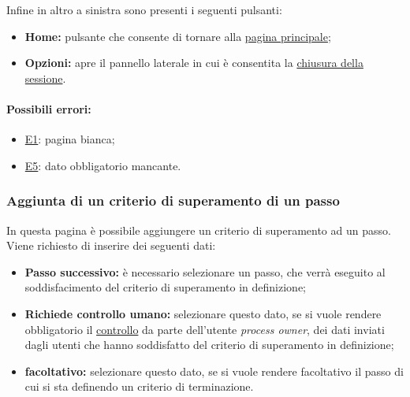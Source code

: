 Infine in altro a sinistra sono presenti i seguenti pulsanti:
\begin{itemize}
\item \textbf{Home:} pulsante che consente di tornare alla \hyperref[home]{pagina principale};
\item \textbf{Opzioni:} apre il pannello laterale in cui è consentita la \hyperref[logout]{chiusura della sessione}.
\end{itemize}

\paragraph*{Possibili errori:}
\begin{itemize}
\item \hyperref[e1]{E1}: pagina bianca;
\item \hyperref[e5]{E5}: dato obbligatorio mancante.
\end{itemize}

\subsubsection{Aggiunta di un criterio di superamento di un passo}
\label{vincoli}

In questa pagina è possibile aggiungere un criterio di superamento ad un passo.
Viene richiesto di inserire dei seguenti dati:
\begin{itemize}
\item \textbf{Passo successivo:} è necessario selezionare un passo, che verrà eseguito al soddisfacimento del criterio di superamento in definizione;
\item \textbf{Richiede controllo umano:} selezionare questo dato, se si vuole rendere obbligatorio il \hyperref[controllo]{controllo} da parte dell'utente \textit{process owner}, dei dati inviati dagli utenti che hanno soddisfatto del criterio di superamento in definizione;
\item \textbf{facoltativo:} selezionare questo dato, se si vuole rendere facoltativo il passo di cui si sta definendo un criterio di terminazione.
\end{itemize}

